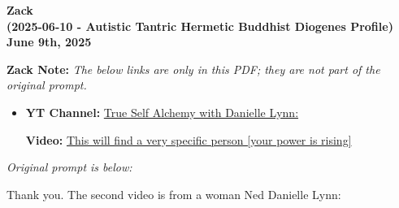 \documentclass{article}
\begin{document}
\begin{center}
\textbf{Zack}\\
\textbf{(2025-06-10 - Autistic Tantric Hermetic Buddhist Diogenes Profile)}\\
\textbf{June 9th, 2025}
\end{center}

\textbf{Zack Note:}
\emph{The below links are only in this PDF; they are not part of the original prompt.}

\begin{itemize}
  \item \textbf{YT Channel:} \href{https://www.youtube.com/@alchemydragon}{True Self Alchemy with Danielle Lynn:} 
  \begin{itemize}
      \textbf{Video:} \href{https://www.youtube.com/watch?v=rCFJwV9esGM}{This will find a very specific person [your power is rising]}
  \end{itemize}
\end{itemize}

\emph{Original prompt is below:}

Thank you. The second video is from a woman Ned Danielle Lynn:
\end{document}
